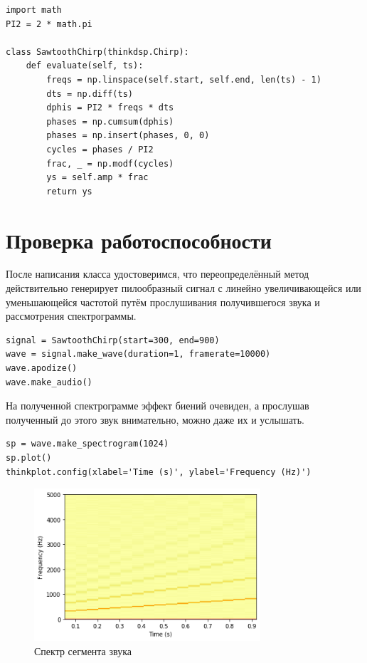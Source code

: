 \documentclass[a4paper,12pt]{report}
\begin{document}
\begin{lstlisting}[caption=Класс SawtoothChirp]
import math
PI2 = 2 * math.pi

class SawtoothChirp(thinkdsp.Chirp):
    def evaluate(self, ts):
        freqs = np.linspace(self.start, self.end, len(ts) - 1)
        dts = np.diff(ts)
        dphis = PI2 * freqs * dts
        phases = np.cumsum(dphis)
        phases = np.insert(phases, 0, 0)
        cycles = phases / PI2
        frac, _ = np.modf(cycles)
        ys = self.amp * frac
        return ys
\end{lstlisting}

\section{Проверка работоспособности}

После написания класса удостоверимся, что переопределённый метод действительно генерирует пилообразный сигнал с линейно увеличивающейся или уменьшающейся частотой путём прослушивания получившегося звука и рассмотрения спектрограммы.

\begin{lstlisting}[caption=Создание и воспроизведение звука]
signal = SawtoothChirp(start=300, end=900)
wave = signal.make_wave(duration=1, framerate=10000)
wave.apodize()
wave.make_audio()
\end{lstlisting}
    
На полученной спектрограмме эффект биений очевиден, а прослушав полученный до этого звук внимательно, можно даже их и услышать.

\begin{lstlisting}[caption=Спектрограмма звука]
sp = wave.make_spectrogram(1024)
sp.plot()
thinkplot.config(xlabel='Time (s)', ylabel='Frequency (Hz)')
\end{lstlisting}

\begin{figure}[H]
        \centering
        \includegraphics[width=0.75\textwidth]{lab3_fig2_1.png}
        \caption{Спектр сегмента звука}
        \label{fig:lab3_fig2_1}
\end{figure}
\end{document}
